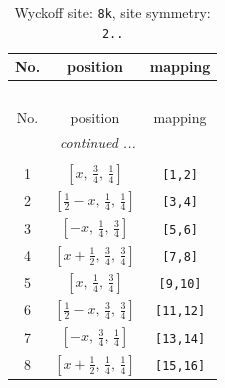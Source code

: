 \documentclass[fleqn,8pt]{jsarticle}
\begin{document}
\begin{longtable}{ccc}
\caption{Wyckoff site: {\tt 8k}, site symmetry: {\tt 2..}}
 \\
 \hline \hline
No. & position & mapping \\ \hline \endfirsthead

\multicolumn{2}{l}{\tablename\ \thetable{}} \\
 \hline \hline
No. & position & mapping \\ \hline \endhead

 \hline \hline
\multicolumn{2}{r}{\footnotesize\it continued ...} \\ \endfoot

 \hline \hline
\multicolumn{2}{r}{} \\ \endlastfoot

1 & $\left[ x,\, \frac{3}{4},\, \frac{1}{4} \right]$ & {\tt [1,2]} \\ \hline
2 & $\left[ \frac{1}{2} - x,\, \frac{1}{4},\, \frac{1}{4} \right]$ & {\tt [3,4]} \\ \hline
3 & $\left[ - x,\, \frac{1}{4},\, \frac{3}{4} \right]$ & {\tt [5,6]} \\ \hline
4 & $\left[ x + \frac{1}{2},\, \frac{3}{4},\, \frac{3}{4} \right]$ & {\tt [7,8]} \\ \hline
5 & $\left[ x,\, \frac{1}{4},\, \frac{3}{4} \right]$ & {\tt [9,10]} \\ \hline
6 & $\left[ \frac{1}{2} - x,\, \frac{3}{4},\, \frac{3}{4} \right]$ & {\tt [11,12]} \\ \hline
7 & $\left[ - x,\, \frac{3}{4},\, \frac{1}{4} \right]$ & {\tt [13,14]} \\ \hline
8 & $\left[ x + \frac{1}{2},\, \frac{1}{4},\, \frac{1}{4} \right]$ & {\tt [15,16]} \\
\end{longtable}
\renewcommand{\arraystretch}{1.2}
\end{document}
